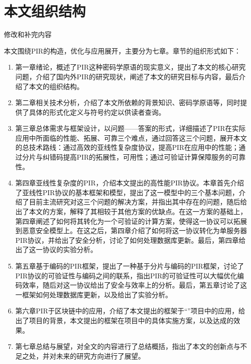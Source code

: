 \section{本文组织结构}
{修改和补完内容}

本文围绕PIR的构造，优化与应用展开，主要分为七章。章节的组织形式如下：
\begin{enumerate}
    \item 第一章绪论，概述了PIR这种密码学原语的现实意义，提出了本文的核心研究问题，介绍了国内外PIR的研究现状，阐述了本文的研究目标与内容，最后介绍了本文的组织结构。
    \item 第二章相关技术分析，介绍了本文所依赖的背景知识、密码学原语等，同时提供了具体的形式化定义与符号约定以供读者查询。
    \item 第三章总体需求与框架设计，以问题——答案的形式，详细描述了PIR在实际应用中所面临的性能、拓展、可靠三个难点，通过回答这三个问题，展开本文的总技术路线：通过高效的亚线性复杂度协议，提高PIR在应用中的性能；通过分片与纠错码提高PIR的拓展性，可用性；通过可验证计算保障服务的可靠性。
    \item 第四章亚线性复杂度的PIR，介绍本文提出的高性能PIR协议。本章首先介绍了亚线性PIR协议的基本框架和模型，提出了这一模型中的三个基本问题，介绍了目前主流研究对这三个问题的解决方案，并指出其中存在的问题，随后给出了本文的方案，解释了其相较于其他方案的优缺点。在这一方案的基础上，第四章阐述了如何将其转化为一个可验证的计算方案，使得这一协议可以拓展到恶意安全模型上。在这之后，第四章介绍了如何将这一协议转化为单服务器PIR协议，并给出了安全分析，讨论了如何处理数据库更新。最后，第四章给出了这一协议的实验分析。
    \item 第五章基于编码的PIR框架，提出了一种基于分片与编码的PIR框架，讨论了PIR协议的可验证性与编码之间的联系，指出PIR的可验证性可以大幅优化编码效率，随后对这一协议给出了安全与效率上的分析。最后，第五章讨论了这一框架如何处理数据库更新，以及给出了实验分析。
    \item 第六章PIR于区块链中的应用，介绍了本文提出的框架于“\projectname”项目中的应用，给出了项目的背景，本文提出的框架在项目中的具体实施方案，以及达成的效果。
    \item 第七章总结与展望，对全文的内容进行了总结概括，指出了本文的创新点与不足之处，并对未来的研究方向进行了展望。
\end{enumerate}